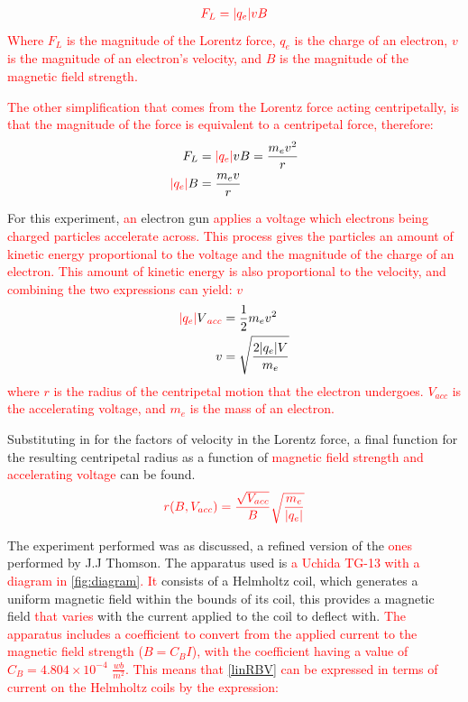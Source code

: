 \documentclass[%
 reprint,
 amsmath,amssymb,
 aps,
]{revtex4-2}
\begin{document}
\begin{align}
   \textcolor{red}{{F_L} = |q_e|{v}{B}}
   \label{magLorentz}
\end{align}
\textcolor{red}{Where $F_L$ is the magnitude of the Lorentz force, $q_e$ is the charge of an electron, $v$ is the magnitude of an electron's velocity, and $B$ is the magnitude of the magnetic field strength.}

\textcolor{red}{The other simplification that comes from the Lorentz force acting centripetally, is that the magnitude of the force is equivalent to a centripetal force, therefore:}
\begin{align}
    F_L &= \textcolor{red}{|q_e|}vB = \frac{m_ev^2}{r} \\
    \textcolor{red}{|q_e|}B &= \frac{m_ev}{r}   
\end{align}

For this experiment, \textcolor{red}{an} electron gun \textcolor{red}{applies a voltage which electrons being charged particles accelerate across. This process gives the particles an amount of kinetic energy proportional to the voltage and the magnitude of the charge of an electron. This amount of kinetic energy is also proportional to the velocity, and combining the two expressions can yield: $v$}
\begin{align}
    \textcolor{red}{|q_e|}V\textcolor{red}{_{acc}} &= \frac{1}{2}m_ev^2 \\
    v &= \sqrt{\frac{2|q_e|V}{m_e}}
\end{align}
\textcolor{red}{where $r$ is the radius of the centripetal motion that the electron undergoes. $V_{acc}$ is the accelerating voltage, and $m_e$ is the mass of an electron.}

Substituting in for the factors of velocity in the Lorentz force, a final function for the resulting centripetal radius as a function of \textcolor{red}{magnetic field strength and accelerating voltage} can be found. 
\begin{align}
    \textcolor{red}{r(B,V_{acc}) = \frac{\sqrt{V_{acc}}}{B}\sqrt{\frac{m_e}{|q_e|}}}
    \label{linRBV}
\end{align}

The experiment performed was as discussed, a refined version of the \textcolor{red}{ones} performed by J.J Thomson. The apparatus  used is \textcolor{red}{a Uchida TG-13 with a diagram in} \ref{fig:diagram}\textcolor{red}{.} \textcolor{red}{It} consists of a Helmholtz coil, which generates a uniform magnetic field within the bounds of its coil, this provides a magnetic field \textcolor{red}{that varies} with the current applied to the coil to deflect with. \textcolor{red}{The apparatus includes a coefficient to convert from the applied current to the magnetic field strength ($B = C_BI$), with the coefficient having a value of $C_B = 4.804 \times 10^{-4}$ $\frac{\textit{wb}}{\textit{m}^2}$. This means that \eqref{linRBV} can be expressed in terms of current on the Helmholtz coils by the expression:}
\end{document}

